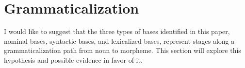 \documentclass[output=paper]{langscibook}
\begin{document}


\section{Grammaticalization}\label{klo:grammaticalization}

I would like to suggest that the three types of bases identified in this paper, nominal bases, syntactic bases, and lexicalized bases, represent stages along a grammaticalization path from noun to morpheme. This section will explore this hypothesis and possible evidence in favor of it.
\end{document}
